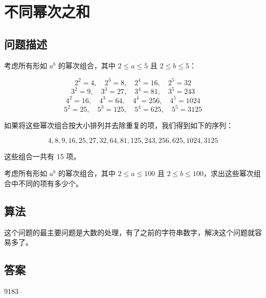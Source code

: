 \section{不同幂次之和}
\subsection{问题描述}
\begin{tcolorbox}
考虑所有形如 \( a^b \) 的幂次组合，其中 \( 2 \leq a \leq 5 \) 且 \( 2 \leq b \leq 5 \)：

\[
2^2 = 4, \quad 2^3 = 8, \quad 2^4 = 16, \quad 2^5 = 32
\]
\[
3^2 = 9, \quad 3^3 = 27, \quad 3^4 = 81, \quad 3^5 = 243
\]
\[
4^2 = 16, \quad 4^3 = 64, \quad 4^4 = 256, \quad 4^5 = 1024
\]
\[
5^2 = 25, \quad 5^3 = 125, \quad 5^4 = 625, \quad 5^5 = 3125
\]

如果将这些幂次组合按大小排列并去除重复的项，我们得到如下的序列：

\[
4, 8, 9, 16, 25, 27, 32, 64, 81, 125, 243, 256, 625, 1024, 3125
\]

这些组合一共有 15 项。

考虑所有形如 \( a^b \) 的幂次组合，其中 \( 2 \leq a \leq 100 \) 且 \( 2 \leq b \leq 100 \)，求出这些幂次组合中不同的项有多少个。

\end{tcolorbox}

\subsection{算法}
这个问题的最主要问题是大数的处理，有了之前的字符串数字，解决这个问题就容易多了。

\subsection{答案}
9183
